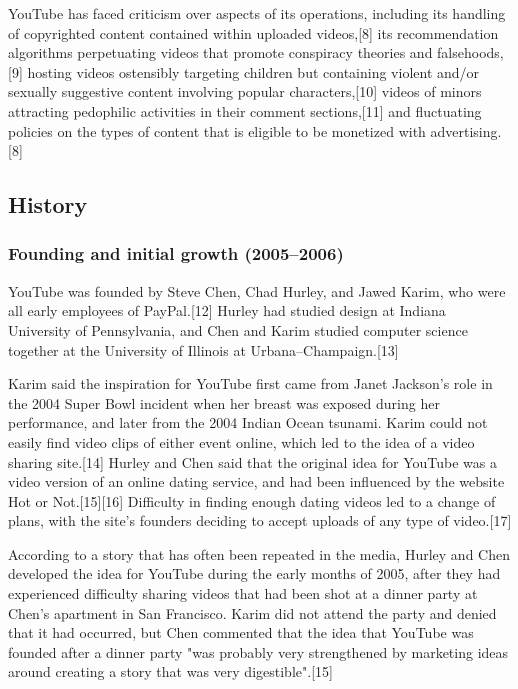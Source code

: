 \documentclass[12pt]{article}
\begin{document}
YouTube has faced criticism over aspects of its operations, including its handling of copyrighted content contained within uploaded videos,[8] its recommendation algorithms perpetuating videos that promote conspiracy theories and falsehoods,[9] hosting videos ostensibly targeting children but containing violent and/or sexually suggestive content involving popular characters,[10] videos of minors attracting pedophilic activities in their comment sections,[11] and fluctuating policies on the types of content that is eligible to be monetized with advertising.[8] 



\subsection{History}

\subsubsection{Founding and initial growth (2005–2006)}



YouTube was founded by Steve Chen, Chad Hurley, and Jawed Karim, who were all early employees of PayPal.[12] Hurley had studied design at Indiana University of Pennsylvania, and Chen and Karim studied computer science together at the University of Illinois at Urbana–Champaign.[13]

Karim said the inspiration for YouTube first came from Janet Jackson's role in the 2004 Super Bowl incident when her breast was exposed during her performance, and later from the 2004 Indian Ocean tsunami. Karim could not easily find video clips of either event online, which led to the idea of a video sharing site.[14] Hurley and Chen said that the original idea for YouTube was a video version of an online dating service, and had been influenced by the website Hot or Not.[15][16] Difficulty in finding enough dating videos led to a change of plans, with the site's founders deciding to accept uploads of any type of video.[17]

According to a story that has often been repeated in the media, Hurley and Chen developed the idea for YouTube during the early months of 2005, after they had experienced difficulty sharing videos that had been shot at a dinner party at Chen's apartment in San Francisco. Karim did not attend the party and denied that it had occurred, but Chen commented that the idea that YouTube was founded after a dinner party "was probably very strengthened by marketing ideas around creating a story that was very digestible".[15] 
\end{document}

